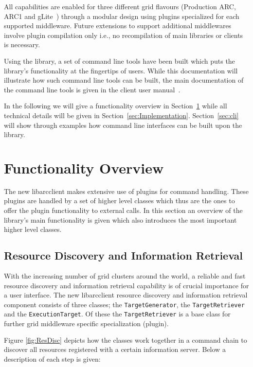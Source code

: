 \documentclass{book}
\newcommand{\libarcclient}{libarcclient}
\newcommand{\ExecutionTarget}{\texttt{ExecutionTarget}}
\newcommand{\TargetGenerator}{\texttt{TargetGenerator}}
\newcommand{\TargetRetriever}{\texttt{TargetRetriever}}
\begin{document}
All capabilities are enabled for three different grid flavours
(Production ARC, ARC1 and gLite~\cite{glite}) through a modular design
using plugins specialized for each supported middleware. Future
extensions to support additional middlewares involve plugin
compilation only i.e., no recompilation of main libraries or clients
is necessary.

Using the library, a set of command line tools have been built which
puts the library's functionality at the fingertips of users. While
this documentation will illustrate how such command line tools can be
built, the main documentation of the command line tools is given in
the client user manual~\cite{ui}.

In the following we will give a functionality overview in
Section~\ref{sec:FuncOver} while all technical details will be given
in Section~\ref{sec:Implementation}. Section~\ref{sec:cli} will
show through examples how command line interfaces can be built upon
the library.

\chapter{Functionality Overview}
\label{sec:FuncOver}

The new {\libarcclient} makes extensive use of plugins for command
handling. These plugins are handled by a set of higher level classes
which thus are the ones to offer the plugin functionality to external
calls. In this section an overview of the library's main functionality
is given which also introduces the most important higher level
classes.

\section{Resource Discovery and Information Retrieval}
\label{sec:TargetDiscovery}

With the increasing number of grid clusters around the world, a
reliable and fast resource discovery and information retrieval
capability is of crucial importance for a user interface. The new
{\libarcclient} resource discovery and information retrieval component
consists of three classes; the {\TargetGenerator}, the
{\TargetRetriever} and the {\ExecutionTarget}. Of these the
{\TargetRetriever} is a base class for further grid middleware
specific specialization (plugin).

Figure \ref{fig:ResDisc} depicts how the classes work together in a
command chain to discover all resources registered with a certain
information server. Below a description of each step is given:
\end{document}

